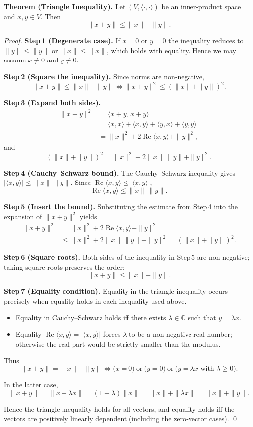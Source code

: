 \textbf{Theorem (Triangle Inequality).}  
Let \((V,\langle\cdot,\cdot\rangle)\) be an inner‑product space and \(x,y\in V\). Then
\[
\|x+y\|\le \|x\|+\|y\|.
\]

\begin{proof}
\textbf{Step 1 (Degenerate case).}  
If \(x=0\) or \(y=0\) the inequality reduces to \(\|y\|\le\|y\|\) or
\(\|x\|\le\|x\|\), which holds with equality. Hence we may assume
\(x\neq0\) and \(y\neq0\).

\textbf{Step 2 (Square the inequality).}  
Since norms are non‑negative,
\[
\|x+y\|\le\|x\|+\|y\|
\iff
\|x+y\|^{2}\le(\|x\|+\|y\|)^{2}.
\]

\textbf{Step 3 (Expand both sides).}
\begin{align*}
\|x+y\|^{2}
   &=\langle x+y,\,x+y\rangle \\
   &=\langle x,x\rangle+\langle x,y\rangle
     +\langle y,x\rangle+\langle y,y\rangle \\
   &=\|x\|^{2}+2\operatorname{Re}\langle x,y\rangle+\|y\|^{2},
\end{align*}
and
\[
(\|x\|+\|y\|)^{2}
   =\|x\|^{2}+2\|x\|\,\|y\|+\|y\|^{2}.
\]

\textbf{Step 4 (Cauchy–Schwarz bound).}  
The Cauchy–Schwarz inequality gives \(|\langle x,y\rangle|\le\|x\|\,\|y\|\).
Since \(\operatorname{Re}\langle x,y\rangle\le|\langle x,y\rangle|\),
\[
\operatorname{Re}\langle x,y\rangle\le\|x\|\,\|y\|.
\]

\textbf{Step 5 (Insert the bound).}  
Substituting the estimate from Step 4 into the expansion of \(\|x+y\|^{2}\) yields
\begin{align*}
\|x+y\|^{2}
   &=\|x\|^{2}+2\operatorname{Re}\langle x,y\rangle+\|y\|^{2}\\
   &\le\|x\|^{2}+2\|x\|\,\|y\|+\|y\|^{2}
    =(\|x\|+\|y\|)^{2}.
\end{align*}

\textbf{Step 6 (Square roots).}  
Both sides of the inequality in Step 5 are non‑negative; taking square roots
preserves the order:
\[
\|x+y\|\le\|x\|+\|y\|.
\]

\textbf{Step 7 (Equality condition).}  
Equality in the triangle inequality occurs precisely when equality holds in
each inequality used above.

\begin{itemize}
\item Equality in Cauchy–Schwarz holds iff there exists \(\lambda\in\mathbb{C}\) such that
\(y=\lambda x\).
\item Equality \(\operatorname{Re}\langle x,y\rangle=|\langle x,y\rangle|\) forces
\(\lambda\) to be a non‑negative real number; otherwise the real part would be
strictly smaller than the modulus.
\end{itemize}
Thus
\[
\|x+y\|=\|x\|+\|y\|
\iff
\bigl(x=0\bigr)\ \text{or}\ \bigl(y=0\bigr)\ \text{or}\ \bigl(y=\lambda x\text{ with }\lambda\ge0\bigr).
\]

In the latter case,
\[
\|x+y\|=\|x+\lambda x\|=(1+\lambda)\|x\|
        =\|x\|+\|\lambda x\|=\|x\|+\|y\|.
\]

Hence the triangle inequality holds for all vectors, and equality holds
iff the vectors are positively linearly dependent (including the zero‑vector
cases). \qed
\end{proof}